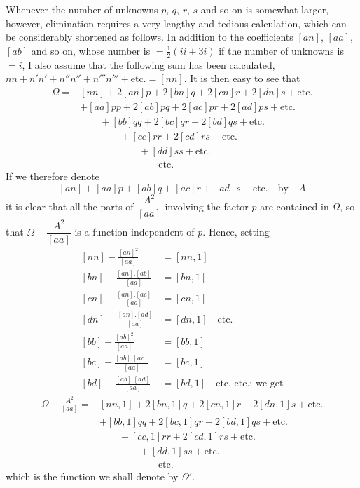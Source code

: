 Whenever the number of unknowns $p$, $q$, $r$, $s$ and so on is somewhat larger, however, elimination requires a very lengthy and tedious calculation, which can be considerably shortened as follows. In addition to the coefficients $[an]$, $[aa]$, $[ab]$ and so on, whose number is $=\tfrac12(ii+3i)$ if the number of unknowns is $=i$, I also assume that the following sum has been calculated, $nn+n'n'+n''n''+n'''n'''+\text{etc.}=[nn]$. It is then easy to see that
\[
\begin{aligned}
\Omega={}&[nn]+2[an]p+2[bn]q+2[cn]r+2[dn]s+\text{etc.}\\
&+[aa]pp+2[ab]pq+2[ac]pr+2[ad]ps+\text{etc.}\\
&\qquad+[bb]qq+2[bc]qr+2[bd]qs+\text{etc.}\\
&\qquad\qquad+[cc]rr+2[cd]rs+\text{etc.}\\
&\qquad\qquad\qquad+[dd]ss+\text{etc.}\\
&\qquad\qquad\qquad\qquad\text{etc.}
\end{aligned}
\]
If we therefore denote
\[
{[an]}+[aa]p+[ab]q+[ac]r+[ad]s+\text{etc.}\quad\text{by}\quad A
\]
it is clear that all the parts of $\dfrac{A^2}{[aa]}$ involving the factor $p$ are contained in $\Omega$, so that $\Omega-\dfrac{A^2}{[aa]}$ is a function independent of $p$. Hence, setting
\[
\begin{aligned}{}
{[nn]}-\frac{[an]^2}{[aa]}&=[nn,1]\\
{[bn]}-\frac{[an].[ab]}{[aa]}&=[bn,1]\\
{[cn]}-\frac{[an].[ac]}{[aa]}&=[cn,1]\\
{[dn]}-\frac{[an].[ad]}{[aa]}&=[dn,1]\quad\text{etc.}\\
{[bb]}-\frac{[ab]^2}{[aa]}&=[bb,1]\\
{[bc]}-\frac{[ab].[ac]}{[aa]}&=[bc,1]\\
{[bd]}-\frac{[ab].[ad]}{[aa]}&=[bd,1]\quad\text{etc. etc.: we get}
\end{aligned}
\]
\[
\begin{aligned}
\Omega-\frac{A^2}{[aa]}={}&[nn,1]+2[bn,1]q+2[cn,1]r+2[dn,1]s+\text{etc.}\\
&+[bb,1]qq+2[bc,1]qr+2[bd,1]qs+\text{etc.}\\
&\qquad+[cc,1]rr+2[cd,1]rs+\text{etc.}\\
&\qquad\qquad+[dd,1]ss+\text{etc.}\\
&\qquad\qquad\qquad\text{etc.}
\end{aligned}
\]
which is the function we shall denote by $\Omega'$.

